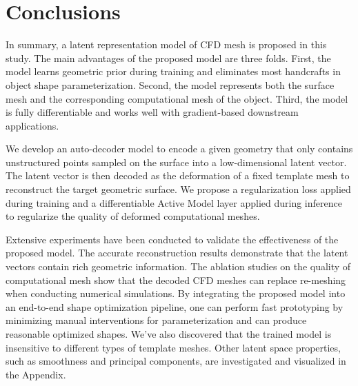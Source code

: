 \section{Conclusions}
In summary, a latent representation model of CFD mesh is proposed in this study.
The main advantages of the proposed model are three folds.
First, the model learns geometric prior during training and eliminates most handcrafts in object shape parameterization.
Second, the model represents both the surface mesh and the corresponding computational mesh of the object.
Third, the model is fully differentiable and works well with gradient-based downstream applications.

We develop an auto-decoder model to encode a given geometry that only contains unstructured points sampled on the surface into a low-dimensional latent vector.
The latent vector is then decoded as the deformation of a fixed template mesh to reconstruct the target geometric surface.
We propose a regularization loss applied during training and a differentiable Active Model layer applied during inference to regularize the quality of deformed computational meshes.

Extensive experiments have been conducted to validate the effectiveness of the proposed model.
The accurate reconstruction results demonstrate that the latent vectors contain rich geometric information.
The ablation studies on the quality of computational mesh show that the decoded CFD meshes can replace re-meshing when conducting numerical simulations.
By integrating the proposed model into an end-to-end shape optimization pipeline, one can perform fast prototyping by minimizing manual interventions for parameterization and can produce reasonable optimized shapes.
We've also discovered that the trained model is insensitive to different types of template meshes. Other latent space properties, such as smoothness and principal components, are investigated and visualized in the Appendix.